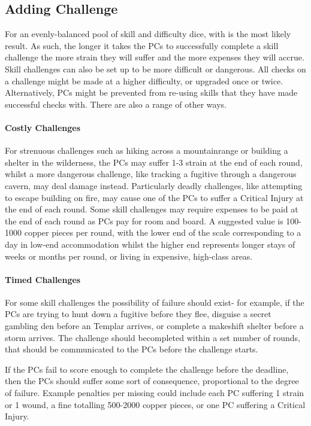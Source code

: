 \begin{multicols}{2}
\subsection{Adding Challenge}
For an evenly-balanced pool of skill and difficulty dice, \success with \triumph is the most likely result.
As such, the longer it takes the PCs to successfully complete a skill challenge the more strain they will
suffer and the more expenses they will accrue. Skill challenges can also be set up to be more difficult or
dangerous. All checks on a challenge might be made at a higher difficulty, or upgraded once or twice.
Alternatively, PCs might be prevented from re-using skills that they have made successful checks with. There
are also a range of other ways.

\paragraph{Costly Challenges}
For strenuous challenges such as hiking across a mountainrange or building a shelter in the wilderness,
the PCs may suffer 1-3 strain at the end of each round, whilst a more dangerous challenge, like tracking
a fugitive through a dangerous cavern, may deal damage instead. Particularly deadly challenges, like
attempting to escape building on fire, may cause one of the PCs to suffer a Critical Injury at the
end of each round. Some skill challenges may require expenses to be paid at the end of each round as PCs
pay for room and board. A suggested value is 100-1000 copper pieces per round, with the lower end of the
scale corresponding to a day in low-end accommodation whilst the higher end represents longer stays of
weeks or months per round, or living in expensive, high-class areas.

\paragraph{Timed Challenges}
For some skill challenges the possibility of failure should exist- for example, if the PCs are trying to
hunt down a fugitive before they flee, disguise a secret gambling den before an Templar arrives, or complete
a makeshift shelter before a storm arrives. The challenge should becompleted within a set number of rounds,
that should be communicated to the PCs before the challenge starts.

If the PCs fail to score enough \success to complete the challenge before the deadline, then the PCs should
suffer some sort of consequence, proportional to the degree of failure. Example penalties per missing \success
could include each PC suffering 1 strain or 1 wound, a fine totalling 500-2000 copper pieces, or one PC suffering
a Critical Injury.


\end{multicols}
